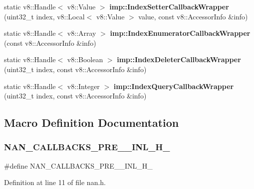 \begin{DoxyCompactItemize}
\item 
static v8\+::\+Handle$<$ v8\+::\+Value $>$ \textbf{ imp\+::\+Index\+Setter\+Callback\+Wrapper} (uint32\+\_\+t index, v8\+::\+Local$<$ v8\+::\+Value $>$ value, const v8\+::\+Accessor\+Info \&info)
\item 
static v8\+::\+Handle$<$ v8\+::\+Array $>$ \textbf{ imp\+::\+Index\+Enumerator\+Callback\+Wrapper} (const v8\+::\+Accessor\+Info \&info)
\item 
static v8\+::\+Handle$<$ v8\+::\+Boolean $>$ \textbf{ imp\+::\+Index\+Deleter\+Callback\+Wrapper} (uint32\+\_\+t index, const v8\+::\+Accessor\+Info \&info)
\item 
static v8\+::\+Handle$<$ v8\+::\+Integer $>$ \textbf{ imp\+::\+Index\+Query\+Callback\+Wrapper} (uint32\+\_\+t index, const v8\+::\+Accessor\+Info \&info)
\end{DoxyCompactItemize}


\subsection{Macro Definition Documentation}
\mbox{\label{nan_8h_ab7e43884662316289aba28c89fb390b1}} 
\subsubsection{N\+A\+N\+\_\+\+C\+A\+L\+L\+B\+A\+C\+K\+S\+\_\+\+P\+R\+E\+\_\+\_\+\+I\+N\+L\+\_\+\+H\+\_\+}
{\footnotesize\ttfamily \#define N\+A\+N\+\_\+\+C\+A\+L\+L\+B\+A\+C\+K\+S\+\_\+\+P\+R\+E\+\_\+\_\+\+I\+N\+L\+\_\+\+H\+\_\+}



Definition at line 11 of file nan.\+h.

